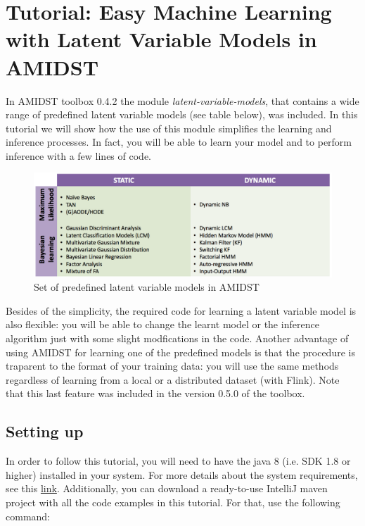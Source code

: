\documentclass[10pt,a4paper]{article}
\begin{document}
\section{Tutorial: Easy Machine Learning with Latent Variable Models in AMIDST}\label{sec:lvmodels}

In AMIDST toolbox 0.4.2 the module \textit{latent-variable-models}, that contains a wide range of predefined latent variable models (see table below), was included. In this tutorial we will show how the use of this module simplifies the learning and inference processes.  In fact, you will be able to learn your model and to perform inference with a few lines of code.


\begin{figure}[h!]
	\centering
	\includegraphics[width=13cm]{img/amidstModels.png}
	\caption{Set of predefined latent variable models in AMIDST}
	\label{fig:lvmodels:amidstModels}	
\end{figure}


Besides of the simplicity, the required code for learning a latent variable model is also flexible: you will be able to change the learnt model or the inference algorithm just with some slight modfications in the code. Another advantage of using AMIDST for learning one of the predefined models is that the procedure is traparent to the format of your training data: you will use the same methods regardless of learning from a local or a distributed dataset (with Flink). Note that this last feature was included in the version 0.5.0 of the toolbox.

\subsection{Setting up}

In order to follow this tutorial, you will need to have the java 8 (i.e. SDK 1.8 or higher) installed in your system. For more details about the system requirements, see this \href{../GettingStarted/requirements.html}{link}. Additionally, you can download a ready-to-use IntelliJ maven project with all the code examples in this tutorial. For that, use the following command:
\end{document}
